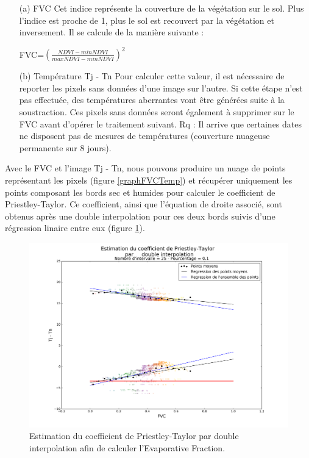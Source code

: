 \documentclass[10pt,a4paper]{article}
\begin{document}
\begin{enumerate}
\item[(a)]FVC \medbreak
Cet indice représente la couverture de la végétation sur le sol. Plus l'indice est proche de 1, plus le sol est recouvert par la végétation et inversement. Il se calcule de la manière suivante :
\begin{center}
\textrm{FVC}=$ (\frac{NDVI-minNDVI}{maxNDVI-minNDVI})^2 $
\end{center}\smallbreak

\item[(b)]Température Tj - Tn \medbreak
Pour calculer cette valeur, il est nécessaire de reporter les pixels sans données d'une image sur l'autre. Si cette étape n'est pas effectuée, des températures aberrantes vont être générées suite à la soustraction. Ces pixels sans données seront également à supprimer sur le FVC avant d'opérer le traitement suivant. Rq : Il arrive que certaines dates ne disposent pas de mesures de températures (couverture nuageuse permanente sur 8 jours).
\end{enumerate}

Avec le FVC et l'image Tj - Tn, nous pouvons produire un nuage de points représentant les pixels (figure \ref{graphFVCTemp}) et récupérer uniquement les points composant les bords sec et humides pour calculer le coefficient de Priestley-Taylor. Ce coefficient, ainsi que l'équation de droite associé, sont obtenus après une double interpolation pour ces deux bords suivis d'une régression linaire entre eux (figure \ref{graphPriestley}).

\begin{figure}[!h]
\centering
\includegraphics[scale=0.35]{img/graph_priestley.png}
\caption{Estimation du coefficient de Priestley-Taylor par double interpolation afin de calculer l'Evaporative Fraction.}
\label{graphPriestley}
\end{figure}
\end{document}
